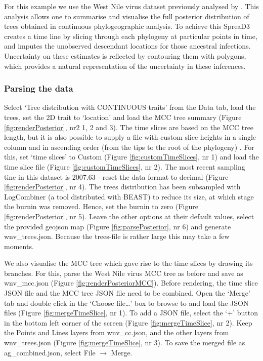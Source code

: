 \documentclass[english]{paper}
\begin{document}
For this example we use the West Nile virus dataset previously analysed by \citet{Pybus:2012aa}.
This analysis allows one to summarise and visualise the full posterior distribution of trees obtained in continuous phylogeographic analysis. 
To achieve this SpreaD3 creates a time line by slicing through each phylogeny at particular points in time, and imputes the unobserved descendant locations for those ancestral infections.
Uncertainty on these estimates is reflected by contouring them with polygons, which provides a natural representation of the uncertainty in these inferences. 

\subsubsection{Parsing the data}

Select `Tree distribution with CONTINUOUS traits' from the Data tab, load the trees, set the 2D trait to `location' and load the MCC tree summary 
(Figure \ref{fig:renderPosterior}, nr2 1, 2 and 3).
The time slices are based on the MCC tree length, but it is also possible to supply a file with custom slice heights in a single column and in ascending order (from the tips to the root of the phylogeny) . 
For this, set `time slices' to Custom (Figure \ref{fig:customTimeSlices}, nr 1) and load the time slice file (Figure \ref{fig:customTimeSlices}, nr 2).
The most recent sampling tine in this dataset is 2007.63 - reset the data format to decimal 
(Figure \ref{fig:renderPosterior}, nr 4).
The trees distribution has been subsampled with LogCombiner (a tool distributed with BEAST) to reduce its size, at which stage the burnin was removed. 
Hence, set the burnin to zero 
(Figure \ref{fig:renderPosterior}, nr 5).
Leave the other options at their default values, select the provided geojson map (Figure \ref{fig:parsePosterior}, nr 6) and generate wnv\_trees.json.
Because the trees-file is rather large this may take a few moments.
\par
We also visualise the MCC tree which gave rise to the time slices by drawing its branches.
For this, parse the West Nile virus MCC tree as before and save as wnv\_mcc.json (Figure \ref{fig:renderPosteriorMCC}).
Before rendering, the time slice JSON file and the MCC tree JSON file need to be combined.
Open the `Merge' tab and double click in the `Choose file\dots' box to browse to and load the JSON files (Figure \ref{fig:mergeTimeSlice}, nr 1).
To add a JSON file, select the `+' button in the bottom left corner of the screen (Figure \ref{fig:mergeTimeSlice}, nr 2).
Keep the Points and Lines layers from wnv\_cc.json, and the other layers from wnv\_trees.json (Figure \ref{fig:mergeTimeSlice}, nr 3).
To save the merged file as ag\_combined.json, select File $\rightarrow$  Merge. 
\end{document}
